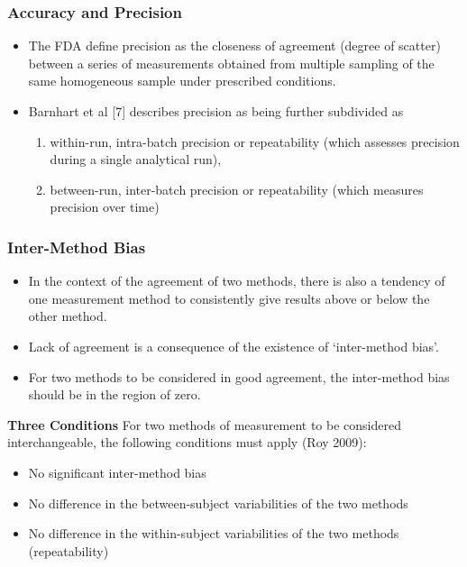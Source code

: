 \documentclass[compress]{beamer}        %
\makeatletter
\newcommand{\tcb}{\textcolor{beamer@blendedblue}}
\makeatother
\begin{document}
\begin{frame}
\frametitle{Accuracy and Precision}
\large
\begin{itemize}
\item 
The FDA define precision as the closeness of agreement (degree of
scatter) between a series of measurements obtained from multiple
sampling of the same homogeneous sample under prescribed
conditions. \item Barnhart et al [7] describes precision as being further
subdivided as
\begin{enumerate}
\item  within-run, intra-batch precision or
repeatability (which assesses precision during a single analytical
run), 
\item between-run, inter-batch precision or repeatability
(which measures precision over time)
\end{enumerate} 
\end{itemize}
\end{frame}
\begin{frame}
\frametitle{Inter-Method Bias}
\large
\vspace{-1cm}
\begin{itemize}
\item 
In the context of the agreement of two methods, there is also a
tendency of one measurement method to consistently give results
above or below the other method. \item Lack of agreement is a
consequence of the existence of `inter-method bias'. 
\item For two
methods to be considered in good agreement, the inter-method bias
should be in the region of zero. 
\end{itemize}
\end{frame}
\begin{frame}{\bf \tcb{Three Conditions}}
For two methods of measurement to be considered interchangeable, the following conditions must apply (Roy 2009):
\\
\begin{itemize}\itemsep0.5cm
\item No significant inter-method bias
\item No difference in the between-subject variabilities of the two methods
\item No difference in the within-subject variabilities of the two methods (repeatability)
\end{itemize}
\end{frame}
\end{document}
